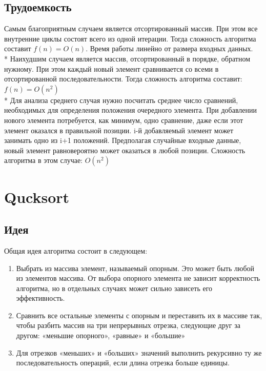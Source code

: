 \documentclass[a4paper,12pt]{article}
\begin{document}
	\subsection{Трудоемкость}
	Самым благоприятным случаем является отсортированный массив. При этом все внутренние циклы состоят всего из одной итерации. Тогда сложность алгоритма составит $f(n)=O(n)$. Время работы линейно от размера входных данных.\\*
	Наихудшим случаем является массив, отсортированный в порядке, обратном нужному. При этом каждый новый элемент сравнивается со всеми в отсортированной последовательности. Тогда сложность алгоритма составит:$f(n)=O(n^2)$\\*
	Для анализа среднего случая нужно посчитать среднее число сравнений, необходимых для определения положения очередного элемента. При добавлении нового элемента потребуется, как минимум, одно сравнение, даже если этот элемент оказался в правильной позиции. i-й добавляемый элемент может занимать одно из i+1 положений. Предполагая случайные входные данные, новый элемент равновероятно может оказаться в любой позиции. Сложность алгоритма в этом случае: $O(n^2)$
\section{Qucksort}
	\subsection{Идея}
	Общая идея алгоритма состоит в следующем:
	\begin{enumerate}
		\item Выбрать из массива элемент, называемый опорным. Это может быть любой из элементов массива. От выбора опорного элемента не зависит корректность алгоритма, но в отдельных случаях может сильно зависеть его эффективность.
		\item Сравнить все остальные элементы с опорным и переставить их в массиве так, чтобы разбить массив на три непрерывных отрезка, следующие друг за другом: «меньшие опорного», «равные» и «большие»
		\item Для отрезков «меньших» и «больших» значений выполнить рекурсивно ту же последовательность операций, если длина отрезка больше единицы.
	\end{enumerate}	
\end{document}
